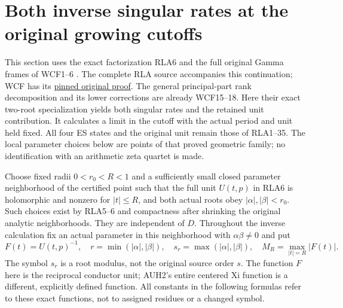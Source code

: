 \documentclass[11pt]{article}
\begin{document}
\section{Both inverse singular rates at the original growing cutoffs}
This section uses the exact factorization RLA6 \cite{RLA008} and the full original
Gamma frames of WCF1--6 \cite{WCF,DLMF18Source}. The complete RLA source accompanies
this continuation; WCF has its
\href{https://github.com/KokunoYumeto/zeta-function-research-reader/blob/5992ad50c0f2a06921f1fcaded7b4e38097c0739/workbenches/splitzero-tandem/continuations/20260920-original-kernel-mixed-determinants/providers/WEIGHTED_CONDUCTOR_FORWARD.tex#L28}{pinned original proof}.
The general principal-part rank decomposition and its lower corrections
are already WCF15--18. Here their exact two-root specialization yields
both singular rates and the retained unit contribution.
It calculates a limit in the cutoff with
the actual period and unit held fixed.  All four ES states and the
original unit remain those of RLA1--35.  The local parameter choices
below are points of that proved geometric family; no identification
with an arithmetic zeta quartet is made.

Choose fixed radii $0<r_0<R<1$ and a sufficiently small closed
parameter neighborhood of the certified point such that the full
unit $U(t,p)$ in RLA6 is holomorphic and nonzero for $|t|\le R$,
and both actual roots obey $|\alpha|,|\beta|<r_0$.
Such choices exist by RLA5--6 and compactness after shrinking
the original analytic neighborhoods.  They are independent of $D$.
Throughout the inverse calculation fix an actual parameter in this
neighborhood with $\alpha\beta\ne0$ and put
\[
 F(t)=U(t,p)^{-1},\quad
 r=\min(|\alpha|,|\beta|),\quad
 s_r=\max(|\alpha|,|\beta|),\quad
 M_R=\max_{|t|=R}|F(t)|.
 \tag{RCM1}
\]
The symbol $s_r$ is a root modulus, not the original source order
$s$. The function $F$ here is the reciprocal conductor unit; AUH2's
entire centered Xi function is a different, explicitly defined function.
All constants in the following formulas refer to these exact
functions, not to assigned residues or a changed symbol.
\end{document}
